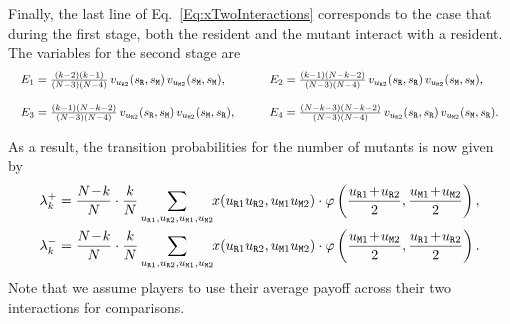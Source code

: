 \documentclass[11pt]{article}
\def\resident{\texttt{R}}
\def\mutant{\texttt{M}}
\def\strategy{s}
\theoremstyle{plainCl1}
\theoremstyle{plainCl2}
\begin{document}
Finally, the last line of Eq.~\eqref{Eq:xTwoInteractions} corresponds to the case that during the first stage, both the resident and the mutant interact with a resident. The variables for the second stage are
\begin{equation*}
  \setlength{\arraycolsep}{10pt}
    \begin{array}{llrl}
   E_1  = \frac{(k - 2)(k - 1)}{(N-3)(N-4)}\, v_{u_{\resident 2}}(\strategy_\resident,\strategy_\mutant)\, v_{u_{\mutant 2}}(\strategy_\mutant,\strategy_\mutant) , \quad
   &E_2 = \frac{\left(k - 1\right) \left(N - k - 2\right)}{(N - 3) (N - 4)}\, v_{u_{\resident 2}}(\strategy_\resident,\strategy_\resident)\, v_{u_{\mutant 2}}(\strategy_\mutant,\strategy_\mutant) , \\[0.5cm] 
   E_3  = \frac{\left(k - 1\right) \left(N - k - 2\right)}{(N - 3) (N - 4)}\, v_{u_{\resident 2}}(\strategy_\resident,\strategy_\mutant)\, v_{u_{\mutant 2}}(\strategy_\mutant,\strategy_\resident) , \quad
   &E_4 = \frac{\left(N - k - 3\right) \left(N - k - 2\right)}{(N - 3) (N - 4)} \,v_{u_{\resident 2}}(\strategy_\resident,\strategy_\resident)\, v_{u_{\mutant 2}}(\strategy_\mutant,\strategy_\resident) .
  \end{array}
\end{equation*}


\noindent
As a result, the transition probabilities for the number of mutants is now given by
\begin{equation}\label{eq:ratio_TwoInteractions}
\begin{array}{l}
\displaystyle \lambda^+_k=\frac{N\!-\!k}{N}\cdot \frac{k}{N} \sum_{u_{\resident 1},u_{\resident 2},u_{\mutant 1},u_{\mutant 2}} \hspace{-0.1cm} x(u_{\resident 1}u_{\resident 2}, u_{\mutant 1}u_{\mutant 2})\cdot \varphi\left(\frac{u_{\resident 1} \!+\! u_{\resident 2}}{2}, \frac{u_{\mutant 1} \!+\! u_{\mutant 2}}{2}\right), \\[0.5cm]
\displaystyle \lambda^-_k=\frac{N\!-\!k}{N}\cdot \frac{k}{N} \sum_{u_{\resident 1},u_{\resident 2},u_{\mutant 1},u_{\mutant 2}} \hspace{-0.1cm} x(u_{\resident 1}u_{\resident 2},u_{\mutant 1}u_{\mutant 2})\cdot \varphi\left(\frac{u_{\mutant 1} \!+\! u_{\mutant 2}}{2}, \frac{u_{\resident 1} \!+\! u_{\resident 2}}{2}\right).
\end{array}
\end{equation}
Note that we assume players to use their average payoff across their two interactions for comparisons.\\
\end{document}
